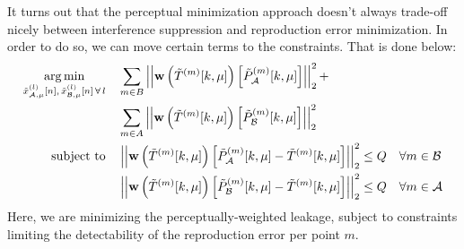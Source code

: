 It turns out that the perceptual minimization approach doesn't always trade-off nicely between interference 
suppression and reproduction error minimization.
In order to do so, we can move certain terms to the constraints.
That is done below:
\begin{align}
    \argmin{\tilde{x}_{\za,\mu}^{(l)}[n],\,\tilde{x}_{\zb,\mu}^{(l)}[n]\,\forall\,l}{
       &\sum_{m\in B} \norm[2][2]{\vec{w}\left(\tilde{T}^{(m)}[k,\mu]\right)
        \left[\tilde{P}_{\za}^{(m)}[k,\mu]\right]} + \\
       &\sum_{m\in A} \norm[2][2]{\vec{w}\left(\tilde{T}^{(m)}[k,\mu]\right)
        \left[\tilde{P}_{\zb}^{(m)}[k,\mu]\right]}
    }\\
    \subjectto{
       &\norm[2][2]{
        \vec{w}\left(\tilde{T}^{(m)}[k,\mu]\right)\left[\tilde{P}_{\za}^{(m)}[k,\mu] - \tilde{T}^{(m)}[k,\mu]\right]} 
        \leq Q\quad\forall m\in\zb \\
       &\norm[2][2]{\vec{w}\left(\tilde{T}^{(m)}[k,\mu]\right)
        \left[\tilde{P}_{\zb}^{(m)}[k,\mu] - \tilde{T}^{(m)}[k,\mu]\right]} \leq Q\quad\forall m\in\za
    }
\end{align}
Here, we are minimizing the perceptually-weighted leakage, subject to constraints limiting the detectability of the reproduction error per point $m$. 
